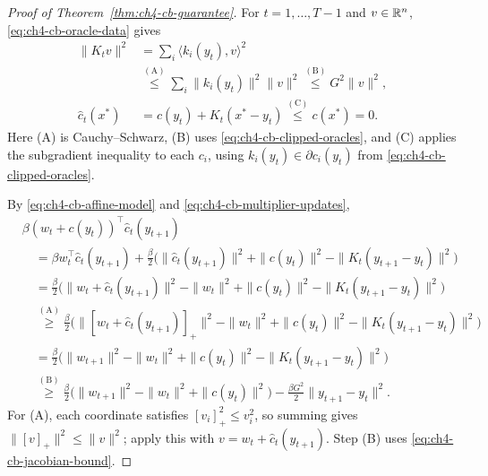 \begin{proof}[Proof of Theorem~\ref{thm:ch4-cb-guarantee}]

For $t=1,\ldots,T-1$ and $v\in\mathbb{R}^n$, \eqref{eq:ch4-cb-oracle-data} gives
\begin{equation}\label{eq:ch4-cb-jacobian-bound}
\begin{aligned}
\|K_tv\|^2
&=\sum_i\langle k_i(y_t),v\rangle^2\\
&\overset{\mathrm{(A)}}{\le}\sum_i\|k_i(y_t)\|^2\|v\|^2
\overset{\mathrm{(B)}}{\le}G^2\|v\|^2,\\
\widehat c_t(x^*)&=c(y_t)+K_t(x^*-y_t)
\overset{\mathrm{(C)}}{\le}c(x^*)=0.
\end{aligned}
\end{equation}
\nopagebreak[3]
Here (A) is Cauchy--Schwarz, (B) uses
\eqref{eq:ch4-cb-clipped-oracles}, and (C) applies the subgradient inequality
to each $c_i$, using $k_i(y_t)\in\partial c_i(y_t)$ from
\eqref{eq:ch4-cb-clipped-oracles}.

By \eqref{eq:ch4-cb-affine-model} and \eqref{eq:ch4-cb-multiplier-updates},
\begin{equation}\label{eq:ch4-cb-constraint-work}
\begin{aligned}
&\beta(w_t+c(y_t))^\top\widehat c_t(y_{t+1})\\
&\quad=\beta w_t^\top\widehat c_t(y_{t+1})
+\frac\beta2\bigl(\|\widehat c_t(y_{t+1})\|^2+\|c(y_t)\|^2-\|K_t(y_{t+1}-y_t)\|^2\bigr)\\
&\quad=\frac\beta2\bigl(\|w_t+\widehat c_t(y_{t+1})\|^2-\|w_t\|^2
+\|c(y_t)\|^2-\|K_t(y_{t+1}-y_t)\|^2\bigr)\\
&\quad\overset{\mathrm{(A)}}{\ge}
\frac\beta2\bigl(\|[w_t+\widehat c_t(y_{t+1})]_+\|^2-\|w_t\|^2
+\|c(y_t)\|^2-\|K_t(y_{t+1}-y_t)\|^2\bigr)\\
&\quad=\frac\beta2\bigl(\|w_{t+1}\|^2-\|w_t\|^2
+\|c(y_t)\|^2-\|K_t(y_{t+1}-y_t)\|^2\bigr)\\
&\quad\overset{\mathrm{(B)}}{\ge}
\frac\beta2\bigl(\|w_{t+1}\|^2-\|w_t\|^2+\|c(y_t)\|^2\bigr)
-\frac{\beta G^2}{2}\|y_{t+1}-y_t\|^2.
\end{aligned}
\end{equation}
\nopagebreak[3]
For (A), each coordinate satisfies $[v_i]_+^2\le v_i^2$, so summing gives
$\|[v]_+\|^2\le\|v\|^2$; apply this with
$v=w_t+\widehat c_t(y_{t+1})$. Step (B) uses
\eqref{eq:ch4-cb-jacobian-bound}.


\end{proof}
